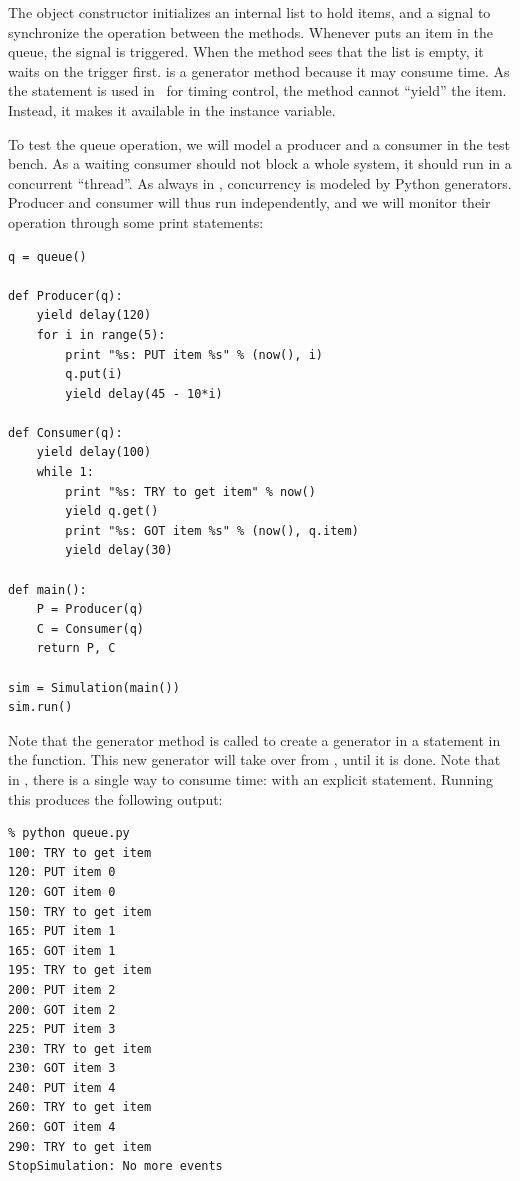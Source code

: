 The  object constructor initializes an internal list to
hold items, and a  signal to synchronize the operation
between the methods. Whenever  puts an item in the
queue, the signal is triggered.  When the  method sees
that the list is empty, it waits on the trigger first.
 is a generator method because 
it may consume time. As the  statement is used in \myhdl\
for timing control, the method cannot ``yield'' the item. Instead, it
makes it available in the \var{item} instance variable.

To test the queue operation, we will model a producer and a consumer
in the test bench.  As a waiting consumer should not block a whole
system, it should run in a concurrent ``thread''. As always in
\myhdl{}, concurrency is modeled by Python generators. Producer
and consumer will thus run independently, and we will monitor
their operation through some print statements:

\begin{verbatim}
q = queue()

def Producer(q):
    yield delay(120)
    for i in range(5):
        print "%s: PUT item %s" % (now(), i)
        q.put(i)
        yield delay(45 - 10*i)

def Consumer(q):
    yield delay(100)
    while 1:
        print "%s: TRY to get item" % now()
        yield q.get()
        print "%s: GOT item %s" % (now(), q.item)
        yield delay(30)

def main():
    P = Producer(q)
    C = Consumer(q)
    return P, C 

sim = Simulation(main())
sim.run()
\end{verbatim}

Note that the generator method  is called to create a
generator in a \code{yield} statement in the 
function. This new generator will take over from \function{Consumer},
until it is done.  Note that in \myhdl{}, there is a single way to
consume time: with an explicit \code{yield} statement.  Running this
produces the following output:

\begin{verbatim}
% python queue.py
100: TRY to get item
120: PUT item 0
120: GOT item 0
150: TRY to get item
165: PUT item 1
165: GOT item 1
195: TRY to get item
200: PUT item 2
200: GOT item 2
225: PUT item 3
230: TRY to get item
230: GOT item 3
240: PUT item 4
260: TRY to get item
260: GOT item 4
290: TRY to get item
StopSimulation: No more events
\end{verbatim}
